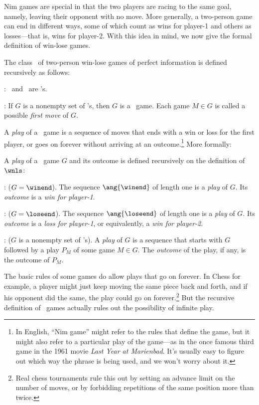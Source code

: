 \begin{definition}
Nim games are special in that the two players are racing to the same
goal, namely, leaving their opponent with no move.  More generally, a
two-person game can end in different ways, some of which count as wins
for player-1 and others as losses---that is, wins for player-2.  With
this idea in mind, we now give the formal definition of win-lose
games.

\begin{definition}
The class \wnls\ of two-person win-lose games of perfect information
is defined recursively as follows:

: \winend\ and \loseend\ are \wnls's.

: If $G$ is a nonempty set of \wnls's,
then $G$ is a \wnls\ game.  Each game $M \in G$ is called a possible
\emph{first move} of $G$.
\end{definition}

A \emph{play} of a \wnls\ game is a sequence of moves that ends with a
win or loss for the first player, or goes on forever without arriving
at an outcome.\footnote{In English, ``Nim game'' might refer to the
  rules that define the game, but it might also refer to a particular
  play of the game---as in the once famous third game in the 1961
  movie \emph{Last Year at Marienbad}.  It's usually easy to figure
  out which way the phrase is being used, and we won't worry about
  it.}
More formally:
\begin{definition*}%
A \emph{play} of a \wnls\ game $G$ and its outcome is defined
recursively on the definition of $\wnls$:

: ($G = \winend$).  The
sequence $\ang{\winend}$ of length one is a \emph{play} of $G$.  Its \emph{outcome}
is a \emph{win for player-1}.

: ($G = \loseend$).  The sequence
$\ang{\loseend}$ of length one is a \emph{play} of $G$.  Its
\emph{outcome} is a \emph{loss for player-1}, or equivalently, a
\emph{win for player-2}.

: ($G$ is a nonempty set of \wnls's).
A \emph{play} of $G$ is a sequence that starts with $G$ followed by a
play $P_M$ of some game $M \in G$.  The \emph{outcome} of the play, if
any, is the outcome of $P_M$.
\end{definition*}

The basic rules of some games do allow plays that go on forever.  In
Chess for example, a player might just keep moving the same piece back
and forth, and if his opponent did the same, the play could go on
forever.\footnote{Real chess tournaments rule this out by setting an
  advance limit on the number of moves, or by forbidding repetitions
  of the same position more than twice.}  But the recursive definition
of \wnls\ games actually rules out the possibility of infinite play.


\end{definition}
